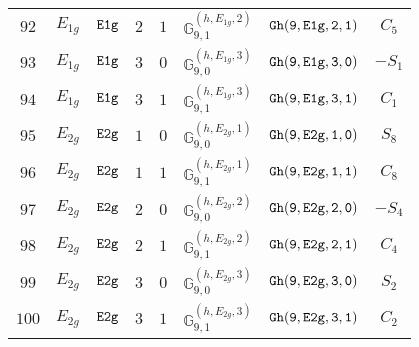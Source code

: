 \documentclass[fleqn,8pt]{jsarticle}
\begin{document}
\begin{table}[ht!]
\begin{center}
\begin{tabular}{cccccccc}
$ 92 $ & $ E_{1g} $ & $ {\tt E1g} $ & $ 2 $ & $ 1 $ & $ \mathbb{G}_{9,1}^{(h,E_{1g},2)} $ & $ {\tt Gh(9,E1g,2,1)} $ & $ C_{5} $ \\
$ 93 $ & $ E_{1g} $ & $ {\tt E1g} $ & $ 3 $ & $ 0 $ & $ \mathbb{G}_{9,0}^{(h,E_{1g},3)} $ & $ {\tt Gh(9,E1g,3,0)} $ & $ - S_{1} $ \\
$ 94 $ & $ E_{1g} $ & $ {\tt E1g} $ & $ 3 $ & $ 1 $ & $ \mathbb{G}_{9,1}^{(h,E_{1g},3)} $ & $ {\tt Gh(9,E1g,3,1)} $ & $ C_{1} $ \\
$ 95 $ & $ E_{2g} $ & $ {\tt E2g} $ & $ 1 $ & $ 0 $ & $ \mathbb{G}_{9,0}^{(h,E_{2g},1)} $ & $ {\tt Gh(9,E2g,1,0)} $ & $ S_{8} $ \\
$ 96 $ & $ E_{2g} $ & $ {\tt E2g} $ & $ 1 $ & $ 1 $ & $ \mathbb{G}_{9,1}^{(h,E_{2g},1)} $ & $ {\tt Gh(9,E2g,1,1)} $ & $ C_{8} $ \\
$ 97 $ & $ E_{2g} $ & $ {\tt E2g} $ & $ 2 $ & $ 0 $ & $ \mathbb{G}_{9,0}^{(h,E_{2g},2)} $ & $ {\tt Gh(9,E2g,2,0)} $ & $ - S_{4} $ \\
$ 98 $ & $ E_{2g} $ & $ {\tt E2g} $ & $ 2 $ & $ 1 $ & $ \mathbb{G}_{9,1}^{(h,E_{2g},2)} $ & $ {\tt Gh(9,E2g,2,1)} $ & $ C_{4} $ \\
$ 99 $ & $ E_{2g} $ & $ {\tt E2g} $ & $ 3 $ & $ 0 $ & $ \mathbb{G}_{9,0}^{(h,E_{2g},3)} $ & $ {\tt Gh(9,E2g,3,0)} $ & $ S_{2} $ \\
$ 100 $ & $ E_{2g} $ & $ {\tt E2g} $ & $ 3 $ & $ 1 $ & $ \mathbb{G}_{9,1}^{(h,E_{2g},3)} $ & $ {\tt Gh(9,E2g,3,1)} $ & $ C_{2} $ \\
 \hline \hline
\end{tabular}
\end{center}
\end{table}
\end{document}

